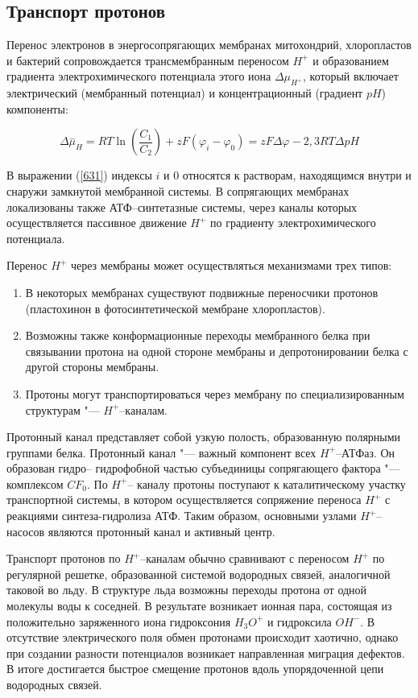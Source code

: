 \documentclass[12pt,a4paper,oneside]{book}
\begin{document}
\subsection{Транспорт протонов}

Перенос электронов в энергосопрягающих мембранах митохондрий, хлоропластов и бактерий сопровождается трансмембранным переносом $H^+$ и образованием градиента электрохимического потенциала этого иона $\Delta \mu_{H^+}$, который включает электрический (мембранный потенциал) и концентрационный (градиент $pH$) компоненты: 

\begin{equation}
\label{631}
\Delta \overset{-}{\mu}_H=RT \ln \left( \frac{C_1}{C_2} \right)+zF(\varphi_i- \varphi_0 )=zF \Delta \varphi-2,3RT \Delta pH
\end{equation}
 
В выражении (\ref{631}) индексы $i$ и $0$ относятся к растворам, находящимся внутри и снаружи замкнутой мембранной системы. В сопрягающих мембранах локализованы также АТФ--синтетазные системы, через каналы которых осуществляется пассивное движение $H^+$ по градиенту электрохимического потенциала.

Перенос $H^+$ через мембраны может осуществляться механизмами трех типов: 

\begin{enumerate}
\item В некоторых мембранах существуют подвижные переносчики протонов (пластохинон в фотосинтетической мембране хлоропластов). 
\item Возможны также конформационные переходы мембранного белка при связывании протона на одной стороне мембраны и депротонировании белка с другой стороны мембраны. 
\item Протоны могут транспортироваться через мембрану по специализированным структурам "--- $H^+$--каналам. 
\end{enumerate}

Протонный канал представляет собой узкую полость, образованную полярными группами белка. Протонный канал "--- важный компонент всех $H^+$--АТФаз. Он образован гидро-- гидрофобной частью субъединицы сопрягающего фактора "--- комплексом $CF_0$. По $H^+$-- каналу протоны поступают к каталитическому участку транспортной системы, в котором осуществляется сопряжение переноса $H^+$ с реакциями синтеза-гидролиза АТФ. Таким образом, основными узлами $H^+$--насосов являются протонный канал и активный центр.

Транспорт протонов по $H^+$--каналам обычно сравнивают с переносом $H^+$ по регулярной решетке, образованной системой водородных связей, аналогичной таковой во льду. В структуре льда возможны переходы протона от одной молекулы воды к соседней. В результате возникает ионная пара, состоящая из положительно заряженного иона гидроксония $H_3O^+$ и гидроксила $OH^-$. В отсутствие электрического поля обмен протонами происходит хаотично, однако при создании разности потенциалов возникает направленная миграция дефектов. В итоге достигается быстрое смещение протонов вдоль упорядоченной цепи водородных связей.
\end{document}
